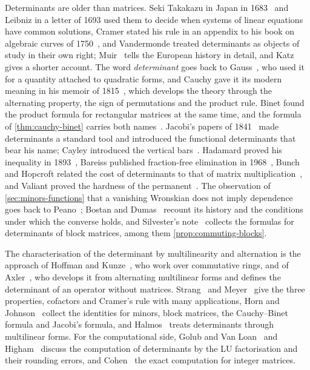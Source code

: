 Determinants are older than matrices. Seki Takakazu in Japan in 1683~\cite{mikami1914} and Leibniz in a letter of 1693 used them to decide when systems of linear equations have common solutions, Cramer stated his rule in an appendix to his book on algebraic curves of 1750~\cite{cramer1750}, and Vandermonde treated determinants as objects of study in their own right; Muir~\cite{muir1906} tells the European history in detail, and Katz~\cite{katz2009} gives a shorter account. The word \emph{determinant} goes back to Gauss~\cite{gauss1801}, who used it for a quantity attached to quadratic forms, and Cauchy gave it its modern meaning in his memoir of 1815~\cite{cauchy1815}, which develops the theory through the alternating property, the sign of permutations and the product rule. Binet found the product formula for rectangular matrices at the same time, and the formula of \cref{thm:cauchy-binet} carries both names~\cite{muir1906}. Jacobi's papers of 1841~\cite{jacobi1841formatione,jacobi1841} made determinants a standard tool and introduced the functional determinants that bear his name; Cayley introduced the vertical bars~\cite{cayley1841}. Hadamard proved his inequality in 1893~\cite{hadamard1893}, Bareiss published fraction-free elimination in 1968~\cite{bareiss1968}, Bunch and Hopcroft related the cost of determinants to that of matrix multiplication~\cite{bunch1974}, and Valiant proved the hardness of the permanent~\cite{valiant1979}. The observation of \cref{sec:minors-functions} that a vanishing Wronskian does not imply dependence goes back to Peano~\cite{peano1889wronskien,peano1889wronskiens}; Bostan and Dumas~\cite{bostan2010} recount its history and the conditions under which the converse holds, and Silvester's note~\cite{silvester2000} collects the formulas for determinants of block matrices, among them \cref{prop:commuting-blocks}.

The characterisation of the determinant by multilinearity and alternation is the approach of Hoffman and Kunze~\cite[Chap.~5]{hoffman1971}, who work over commutative rings, and of Axler~\cite{axler2024}, who develops it from alternating multilinear forms and defines the determinant of an operator without matrices. Strang~\cite{strang2016} and Meyer~\cite{meyer2000} give the three properties, cofactors and Cramer's rule with many applications, Horn and Johnson~\cite[Sects.~0.3 and~0.8]{horn2013} collect the identities for minors, block matrices, the Cauchy--Binet formula and Jacobi's formula, and Halmos~\cite{halmos1958} treats determinants through multilinear forms. For the computational side, Golub and Van Loan~\cite{golub2013} and Higham~\cite{higham2002accuracy} discuss the computation of determinants by the LU factorisation and their rounding errors, and Cohen~\cite{cohen1993} the exact computation for integer matrices.

\chapterreferences
